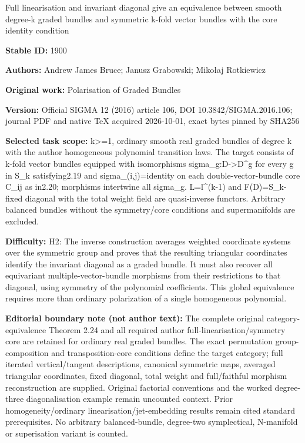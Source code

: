\documentclass[11pt]{article}
\numberwithin{equation}{section}
\begin{document}
\begin{center}\Large Full linearisation and invariant diagonal give an equivalence between smooth degree-k graded bundles and symmetric k-fold vector bundles with the core identity condition\end{center}
\noindent\textbf{Stable ID:} 1900\par
\noindent\textbf{Authors:} Andrew James Bruce; Janusz Grabowski; Mikołaj Rotkiewicz\par
\noindent\textbf{Original work:} Polarisation of Graded Bundles\par
\noindent\textbf{Version:} Official SIGMA 12 (2016) article 106, DOI 10.3842/SIGMA.2016.106; journal PDF and native TeX acquired 2026-10-01, exact bytes pinned by SHA256\par
\noindent\textbf{Selected task scope:} k>=\allowbreak{}1, ordinary smooth real graded bundles of degree k with the author homogeneous polynomial transition laws. The target consists of k-fold vector bundles equipped with isomorphisms sigma\_g:D->D\textasciicircum{}g for every g in S\_k satisfying2.19 and sigma\_(i,j)=\allowbreak{}identity on each double-vector-bundle core C\_ij as in2.20; morphisms intertwine all sigma\_g. L=\allowbreak{}l\textasciicircum{}(k-1) and F(D)=\allowbreak{}S\_k-fixed diagonal with the total weight field are quasi-inverse functors. Arbitrary balanced bundles without the symmetry/core conditions and supermanifolds are excluded.\par
\noindent\textbf{Difficulty:} H2: The inverse construction averages weighted coordinate systems over the symmetric group and proves that the resulting triangular coordinates identify the invariant diagonal as a graded bundle. It must also recover all equivariant multiple-vector-bundle morphisms from their restrictions to that diagonal, using symmetry of the polynomial coefficients. This global equivalence requires more than ordinary polarization of a single homogeneous polynomial.\par
\noindent\textbf{Editorial boundary note (not author text):} The complete original category-equivalence Theorem 2.24 and all required author full-linearisation/symmetry core are retained for ordinary real graded bundles. The exact permutation group-composition and transposition-core conditions define the target category; full iterated vertical/tangent descriptions, canonical symmetric maps, averaged triangular coordinates, fixed diagonal, total weight and full/faithful morphism reconstruction are supplied. Original factorial conventions and the worked degree-three diagonalisation example remain uncounted context. Prior homogeneity/ordinary linearisation/jet-embedding results remain cited standard prerequisites. No arbitrary balanced-bundle, degree-two symplectical, N-manifold or superisation variant is counted.\par
\end{document}
